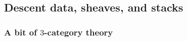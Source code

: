     \subsection{Descent data, sheaves, and stacks}
        \subsubsection{A bit of \texorpdfstring{$3$}{}-category theory}
            \begin{definition} \label{def: lax_natural_transfomrations}
                
            \end{definition}
        
            \begin{definition} \label{def: natural_modifications}
                
            \end{definition}
            
